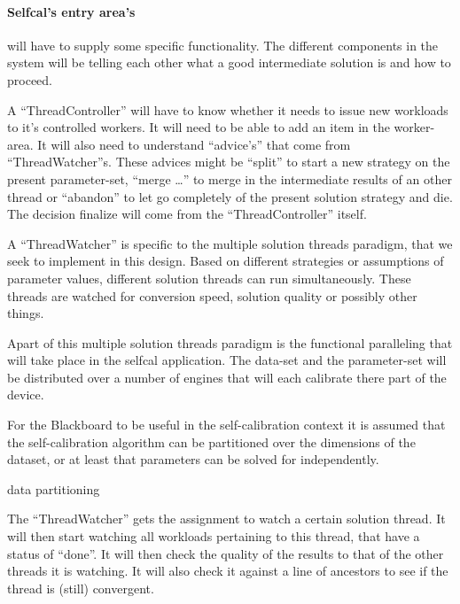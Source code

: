 \documentclass[]{lofar}
\begin{document}
        \paragraph{Selfcal's entry area's} will have to supply some
          specific functionality. The different components in the
          system will be telling each other what a good intermediate
          solution is and how to proceed.

          A ``ThreadController''  will have to know whether it needs to issue new
          workloads to it's controlled workers. It will need to be
          able to add an item in the worker-area. It will also need to
          understand ``advice's'' that come from
          ``ThreadWatcher''s. These advices might be ``split'' to
          start a new strategy on the present parameter-set, ``merge
          \ldots'' to merge in the intermediate results of an other
          thread or ``abandon'' to let go completely of the present
          solution strategy and die. The decision finalize will come
          from the ``ThreadController'' itself.

          A ``ThreadWatcher''  is
          specific to the multiple solution threads paradigm, that we
          seek to implement in this design. Based on different
          strategies or assumptions of parameter values, different
          solution threads can run
          simultaneously. These threads are watched for conversion
          speed, solution quality or possibly other things.

          Apart of this multiple solution threads paradigm is the
          functional paralleling that will take place in the selfcal
          application. The data-set and the parameter-set will be
          distributed over a number of engines that will each
          calibrate there part of the device.

          \begin{assumption}
            For the Blackboard to be useful in the self-calibration
            context it is assumed that the self-calibration algorithm
            can be partitioned over the dimensions of the dataset, or
            at least that parameters can be solved for
            independently.\footnotemark[\value{footnote}]
            \caption{data partitioning\label{ass:partitionable}}
          \end{assumption}


          The ``ThreadWatcher''  gets
          the assignment to watch a certain solution
          thread. It will then start
          watching all workloads pertaining to this thread, that have
          a status of ``done''. It will then check the quality of the
          results to that of the other threads it is watching. It will
          also check it against a line of ancestors to see if the
          thread is (still) convergent.
\end{document}
